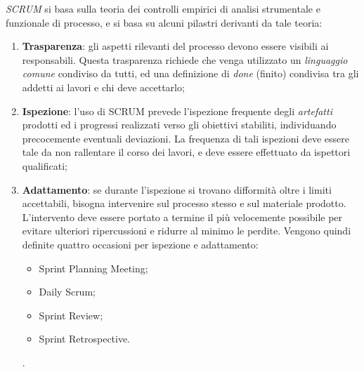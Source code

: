 \documentclass[a4paper,12pt]{report}
\begin{document}
				\emph{SCRUM} si basa sulla teoria dei controlli empirici di analisi strumentale e funzionale di processo, e si basa
				su alcuni pilastri derivanti da tale teoria:
				\begin{enumerate}
					\item \textbf{Trasparenza}: gli aspetti rilevanti del processo devono essere visibili ai responsabili. Questa trasparenza richiede che venga utilizzato un \emph{linguaggio comune} condiviso da tutti, ed una definizione di
					\emph{done} (finito) condivisa tra gli addetti ai lavori e chi deve accettarlo;
					\item \textbf{Ispezione}: l'uso di SCRUM prevede l'ispezione frequente degli \emph{artefatti} prodotti ed
					i progressi realizzati verso gli obiettivi stabiliti, individuando precocemente eventuali deviazioni.
					La frequenza di tali ispezioni deve essere tale da non rallentare il corso dei lavori, e deve essere effettuato
					da ispettori qualificati;
					\item \textbf{Adattamento}: se durante l'ispezione si trovano difformità oltre i limiti accettabili, bisogna
					intervenire sul processo stesso e sul materiale prodotto. L'intervento deve essere portato a termine il più
					velocemente possibile per evitare ulteriori ripercussioni e ridurre al minimo le perdite. Vengono quindi definite
					quattro occasioni per ispezione e adattamento:
					\begin{itemize}
						\item Sprint Planning Meeting;
						\item Daily Scrum;
						\item Sprint Review;
						\item Sprint Retrospective.
					\end{itemize}.
				\end{enumerate}
			
\end{document}
